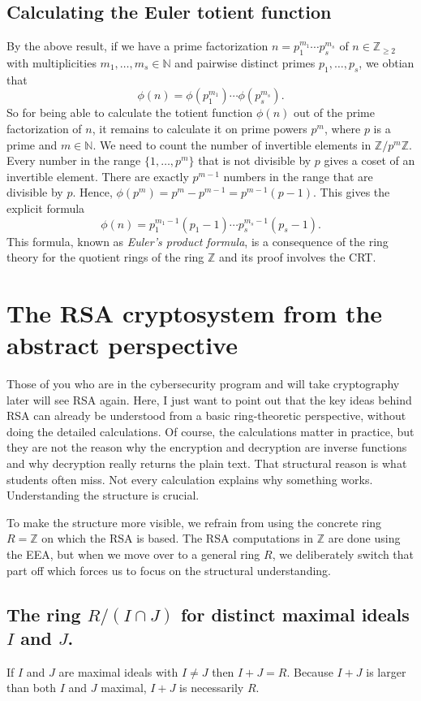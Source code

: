 \documentclass[11pt,a4paper]{amsart}
\newcommand{\Z}{{\mathbb{Z}}}
\newcommand{\N}{{\mathbb{N}}}
\begin{document}
\subsection{Calculating the Euler totient function} By the above result, if we have a prime factorization $n = p_1^{m_1} \cdots p_s^{m_s}$ of $n \in \Z_{\ge 2}$ with multiplicities $m_1,\ldots, m_s \in \N$ and pairwise distinct primes $p_1,\ldots,p_s$, we obtian that 
\[
	\phi(n) = \phi(p_1^{m_1}) \cdots \phi(p_s^{m_s}).
\]
So for being able to calculate the totient function $\phi(n)$ out of the prime factorization of $n$, it remains to calculate it on prime powers $p^m$, where $p$ is a prime and $m \in \N$. We need to count the number of invertible elements in $\Z / p^m \Z$. Every number in the range $\{1,\ldots, p^m\}$ that is not divisible by $p$ gives a coset of an invertible element. There are exactly $p^{m-1}$ numbers in the range that are divisible by $p$. Hence, $\phi(p^m) = p^m - p^{m-1} = p^{m-1} (p-1)$. This gives the explicit formula 
\[
	\phi( n) = p_1^{m_1-1} (p_1-1) \cdots p_s^{m_s-1} (p_s-1). 
\]
This formula, known as \emph{Euler's product formula},  is a consequence of the ring theory for the quotient rings of the ring $\Z$ and its proof involves the CRT. 

\section{The RSA cryptosystem from the abstract perspective} 

Those of you who are in the cybersecurity program and will take cryptography later will see RSA again. Here, I just want to point out that the key ideas behind RSA can already be understood from a basic ring-theoretic perspective, without doing the detailed calculations. Of course, the calculations matter in practice, but they are not the reason why the encryption and decryption are inverse functions and why decryption really returns the plain text. That structural reason is what students often miss. Not every calculation explains why something works. Understanding the structure is crucial. 

To make the  structure more visible, we refrain from using the concrete ring $R =\Z$ on which the RSA is based. The RSA computations in $\Z$ are done using the EEA, but when we move over to a general ring $R$, we deliberately switch that part off which forces us to focus on the structural understanding. 

\subsection{The ring $R / ( I \cap J)$ for distinct maximal ideals $I$ and $J$.} If $I$ and $J$ are maximal ideals with $I \ne J$ then $I +J = R$.
Because $I+J$ is larger than both $I$ and $J$ maximal, $I+J$ is necessarily $R$. 
\end{document}
